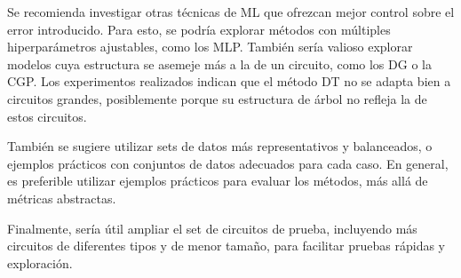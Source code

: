 
Se recomienda investigar otras técnicas de ML que ofrezcan mejor control sobre
el error introducido. Para esto, se podría explorar métodos con múltiples
hiperparámetros ajustables, como los MLP.
También sería valioso explorar modelos cuya estructura se asemeje más a la de
un circuito, como los DG o la CGP.
Los experimentos realizados indican que el método DT no se adapta bien a
circuitos grandes, posiblemente porque su estructura de árbol no refleja la de
estos circuitos.
%

También se sugiere utilizar sets de datos más representativos y balanceados, o
ejemplos prácticos con conjuntos de datos adecuados para cada caso.
En general, es preferible utilizar ejemplos prácticos para evaluar los métodos,
más allá de métricas abstractas.

Finalmente, sería útil ampliar el set de circuitos de prueba, incluyendo más
circuitos de diferentes tipos y de menor tamaño, para facilitar pruebas rápidas
y exploración.
